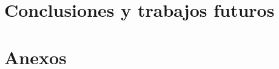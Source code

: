 \documentclass[11pt,twoside]{docs/thesis}
\begin{document}
% 

\chapter{Conclusiones y trabajos futuros}







\chapter*{Anexos} \label{anexus}



\printindex
\end{document}
